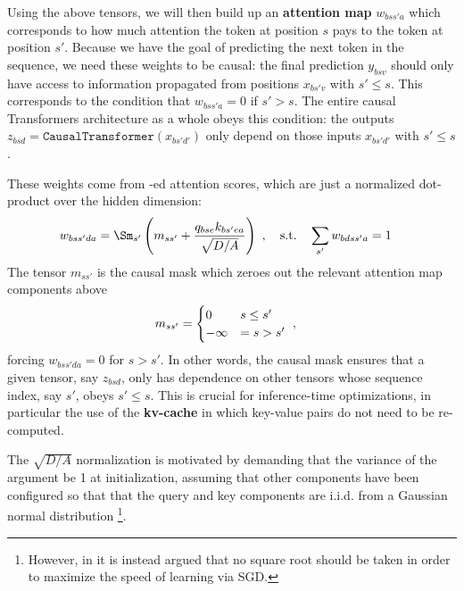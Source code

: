 Using the above tensors, we will then build up an \textbf{attention map}  $ w _{ bss'a } $ which
corresponds to how much attention the token at position $ s $ pays to the token at position $ s' $.
Because we have the goal of predicting the next token in the sequence, we need these weights to be
causal: the final prediction $ y _{ bsv } $ should only have access to information propagated from
positions $ x _{ bs'v } $ with $ s' \le s $. This corresponds to the condition that $ w _{ bss'a} =
0  $ if  $ s' > s  $. The entire causal Transformers architecture as a whole obeys this condition:
the outputs $ z _{ bsd } = \texttt{CausalTransformer}(x _{ bs'd' }) $ only depend on those inputs $
x _{ bs'd' } $ with $ s' \le s $.

These weights come from -ed attention scores, which are just a normalized
dot-product over the hidden dimension:
\begin{align}
    w _{ bss'da } & =\Sm _{ s' } \left (m _{ s s' }+\frac{q _{ bse }k _{ bs'ea } }{ \sqrt{D/A}}  \right
	)\ ,  \quad {\rm s.t.} \quad \sum_{s'}w _{ bdss'a } =1
\end{align}
The tensor $ m _{  s s' } $ is the causal mask which zeroes out the relevant attention map
components above
\begin{align}
	m _{ s s' } & = \begin{cases}
		                0       & s \le s' \nonumber\\
		                -\infty & = s > s'
	                \end{cases}\ ,
\end{align}
forcing $ w  _{ bss'da } =0$ for $ s> s' $. In other words, the causal mask ensures that a
given tensor, say $ z _{ bsd } $, only has dependence on other tensors whose sequence index, say $
	s' $, obeys $ s' \le s $.  This is crucial for inference-time optimizations, in particular the use
of the \textbf{kv-cache} in which key-value pairs do not need to be re-computed.

The $ \sqrt{D/A} $ normalization is motivated by demanding
that the variance of the  argument be 1 at initialization, assuming that other
components have been configured so that that the query and key components are i.i.d. from a Gaussian
normal distribution \footnote{However, in \cite{yang2022tensor} it is instead argued that no square
	root should be taken in order to maximize the speed of learning via SGD.}.

